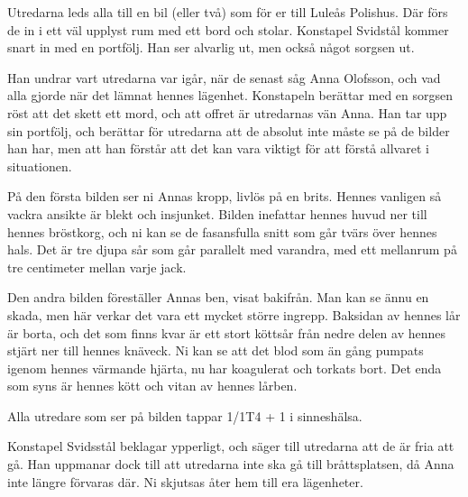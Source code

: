 Utredarna leds alla till en bil (eller två) som för er till Luleås Polishus. Där förs de in i ett väl upplyst rum med ett bord och stolar. Konstapel Svidstål kommer snart in med en portfölj. Han ser alvarlig ut, men också något sorgsen ut.

Han undrar vart utredarna var igår, när de senast såg Anna Olofsson, och vad alla gjorde när det lämnat hennes lägenhet. Konstapeln berättar med en sorgsen röst att det skett ett mord, och att offret är utredarnas vän Anna. Han tar upp sin portfölj, och berättar för utredarna att de absolut inte måste se på de bilder han har, men att han förstår att det kan vara viktigt för att förstå allvaret i situationen.

\begin{displayquote}
	På den första bilden ser ni Annas kropp, livlös på en brits. Hennes vanligen så vackra ansikte är blekt och insjunket. Bilden inefattar hennes huvud ner till hennes bröstkorg, och ni kan se de fasansfulla snitt som går tvärs över hennes hals. Det är tre djupa sår som går parallelt med varandra, med ett mellanrum på tre centimeter mellan varje jack.

	Den andra bilden föreställer Annas ben, visat bakifrån. Man kan se ännu en skada, men här verkar det vara ett mycket större ingrepp. Baksidan av hennes lår är borta, och det som finns kvar är ett stort köttsår från nedre delen av hennes stjärt ner till hennes knäveck. Ni kan se att det blod som än gång pumpats igenom hennes värmande hjärta, nu har koagulerat och torkats bort. Det enda som syns är hennes kött och vitan av hennes lårben.
\end{displayquote}
%
Alla utredare som ser på bilden tappar 1/1T4 + 1 i sinneshälsa. 

Konstapel Svidsstål beklagar ypperligt, och säger till utredarna att de är fria att gå. Han uppmanar dock till att utredarna inte ska gå till bråttsplatsen, då Anna inte längre förvaras där. Ni skjutsas åter hem till era lägenheter.